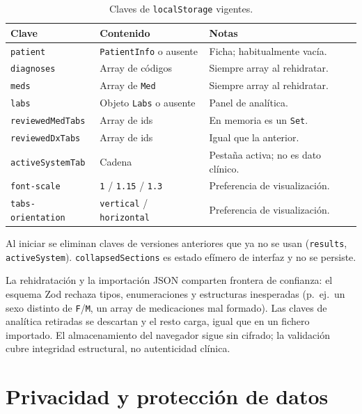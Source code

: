 \begin{table}[H]
  \centering
  \scriptsize
  \begin{tabular}{@{}llp{7.4cm}@{}}
    \toprule
    \textbf{Clave} & \textbf{Contenido} & \textbf{Notas} \\
    \midrule
    \texttt{patient} & \texttt{PatientInfo} o ausente & Ficha; habitualmente vacía. \\
    \texttt{diagnoses} & Array de códigos & Siempre array al rehidratar. \\
    \texttt{meds} & Array de \texttt{Med} & Siempre array al rehidratar. \\
    \texttt{labs} & Objeto \texttt{Labs} o ausente & Panel de analítica. \\
    \texttt{reviewedMedTabs} & Array de ids & En memoria es un \texttt{Set}. \\
    \texttt{reviewedDxTabs} & Array de ids & Igual que la anterior. \\
    \texttt{activeSystemTab} & Cadena & Pestaña activa; no es dato clínico. \\
    \texttt{font-scale} & \texttt{1} / \texttt{1.15} / \texttt{1.3} & Preferencia de visualización. \\
    \texttt{tabs-orientation} & \texttt{vertical} / \texttt{horizontal} & Preferencia de visualización. \\
    \bottomrule
  \end{tabular}
  \caption{Claves de \texttt{localStorage} vigentes.}
  \label{tab:persistencia}
\end{table}

Al iniciar se eliminan claves de versiones anteriores que ya no se usan
(\texttt{results}, \texttt{activeSystem}). \texttt{collapsedSections} es
estado efímero de interfaz y no se persiste.

La rehidratación y la importación JSON comparten frontera de confianza:
el esquema Zod rechaza tipos, enumeraciones y estructuras inesperadas
(p.~ej.\ un sexo distinto de \texttt{F}/\texttt{M}, un array de
medicaciones mal formado). Las claves de analítica retiradas se descartan
y el resto carga, igual que en un fichero importado. El almacenamiento
del navegador sigue sin cifrado; la validación cubre integridad
estructural, no autenticidad clínica.

\section{Privacidad y protección de datos}
\label{sec:privacidad}

